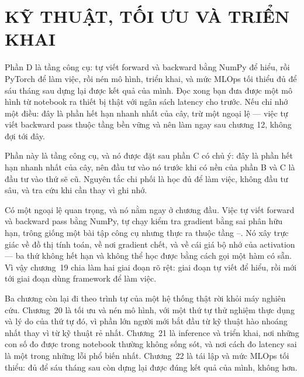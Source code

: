 \documentclass[../deep_learning.tex]{subfiles}
\begin{document}
\part{KỸ THUẬT, TỐI ƯU VÀ TRIỂN KHAI}
\begin{tomtat}
Phần D là tầng công cụ: tự viết forward và backward bằng NumPy để hiểu, rồi PyTorch để làm việc, rồi nén mô hình, triển khai, và mức MLOps tối thiểu đủ để sáu tháng sau dựng lại được kết quả của mình. Đọc xong bạn đưa được một mô hình từ notebook ra thiết bị thật với ngân sách latency cho trước. Nếu chỉ nhớ một điều: đây là phần hết hạn nhanh nhất của cây, trừ một ngoại lệ --- việc tự viết backward pass thuộc tầng bền vững và nên làm ngay sau chương 12, không đợi tới đây.
\end{tomtat}

Phần này là tầng công cụ, và nó được đặt sau phần C có chủ ý: đây là phần hết hạn nhanh nhất của cây, nên đầu tư vào nó trước khi có nền của phần B và C là đầu tư vào thứ sẽ cũ. Nguyên tắc chi phối là học đủ để làm việc, không đầu tư sâu, và tra cứu khi cần thay vì ghi nhớ.

Có một ngoại lệ quan trọng, và nó nằm ngay ở chương đầu. Việc tự viết forward và backward pass bằng NumPy, tự chạy kiểm tra gradient bằng sai phân hữu hạn, trông giống một bài tập công cụ nhưng thực ra thuộc tầng --. Nó xây trực giác về đồ thị tính toán, về nơi gradient chết, và về cái giá bộ nhớ của activation --- ba thứ không hết hạn và không thể học được bằng cách gọi một hàm có sẵn. Vì vậy chương~19 chia làm hai giai đoạn rõ rệt: giai đoạn tự viết để hiểu, rồi mới tới giai đoạn dùng framework để làm việc.

Ba chương còn lại đi theo trình tự của một hệ thống thật rời khỏi máy nghiên cứu. Chương~20 là tối ưu và nén mô hình, với một thứ tự thử nghiệm thực dụng và lý do của thứ tự đó, vì phần lớn người mới bắt đầu từ kỹ thuật hào nhoáng nhất thay vì từ kỹ thuật rẻ nhất. Chương~21 là inference và triển khai, nơi những con số đo được trong notebook thường không sống sót, và nơi cách đo latency sai là một trong những lỗi phổ biến nhất. Chương~22 là tái lập và mức MLOps tối thiểu: đủ để sáu tháng sau còn dựng lại được đúng kết quả của mình, không hơn.





\ifSubfilesClassLoaded{\printbibliography[title={Nguồn}]}{}
\end{document}
